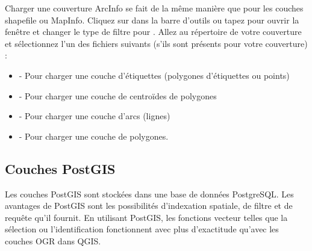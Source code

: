Charger une couverture ArcInfo se fait de la même manière que pour les couches shapefile ou MapInfo. Cliquez sur  dans la barre d'outils ou tapez  pour ouvrir la fenêtre  et changer le type de filtre pour . Allez au répertoire de votre couverture et sélectionnez l'un des fichiers suivants (s'ils sont présents pour votre couverture) :

\begin{itemize}
\item {} - Pour charger une couche d'étiquettes (polygones d'étiquettes ou points)
\item {} - Pour charger une couche de centroïdes de polygones
\item {} - Pour charger une couche d'arcs (lignes)
\item {} - Pour charger une couche de polygones.
\end{itemize}

\subsection{Couches PostGIS}
\label{label_postgis}

Les couches PostGIS sont stockées dans une base de données PostgreSQL. Les avantages de PostGIS sont les possibilités d'indexation spatiale, de filtre et de requête qu'il fournit. En utilisant PostGIS, les fonctions vecteur telles que la sélection ou l'identification fonctionnent avec plus d'exactitude qu'avec les couches OGR dans QGIS.

